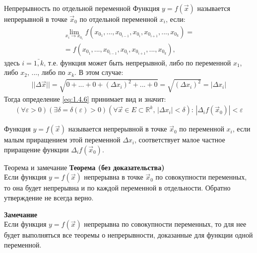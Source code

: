 \begin{tbox}{Непрерывность по отдельной переменной}
	Функция $y = f(\vec{x})$ называется непрерывной в точке $\vec{x}_0$ по отдельной переменной $x_i$, если:
	\begin{multline} \label{eq:1.4.9}
		\lim_{x_i \to x_\text{$0_i$}} f(x_\text{$0_1$}, ..., x_\text{$0_{i-1}$}, x_\text{$0_i$}, x_\text{$0_{i+1}$}, ..., x_\text{$0_k$}) =\\= f(x_\text{$0_1$}, ..., x_\text{$0_{i-1}$}, x_\text{$0_i$}, x_\text{$0_{i+1}$}, ..., x_\text{$0_k$}),
	\end{multline}
	здесь $i = \bar{1, k}$, т.е. функция может быть непрерывной, либо по переменной $x_1$, либо $x_2$, ..., либо по $x_k$. В этом случае:
	\begin{align} \label{eq:1.4.10}
		||\Delta \vec{x}|| = \sqrt{0 + ... + 0 + (\Delta x_i)^2 + ... + 0} = \sqrt{(\Delta x_i)^2} = |\Delta x_i|
	\end{align}
	Тогда определение \cref{eq:1.4.6} принимает вид и значит:
	\begin{align} \label{eq:1.4.11}
		(\forall \varepsilon > 0)(\exists \delta = \delta(\varepsilon) > 0)(\forall \vec{x} \in E \subset \mathbb{R}^k, \, |\Delta x_i| < \delta): \, |\Delta_i f(\vec{x}_0)| < \varepsilon
	\end{align}

	Функция $y=f(\vec{x})$ называется непрерывной в точке $\vec{x}_0$ по переменной $x_i$, если малым приращением этой переменной $\Delta x_i$, соответствует малое частное приращение функции $\Delta_i f(\vec{x}_0)$.
\end{tbox}

\begin{tbox*}{Теорема и замечание}
	\textbf{Теорема (без доказательства)} \\
	Если функция $y=f(\vec{x})$ непрерывна в точке $\vec{x}_0$ по совокупности переменных, то она будет непрерывна и по каждой переменной в отдельности. Обратно утверждение не всегда верно.

	\textbf{Замечание} \\
	Если функция $y = f(\vec{x})$ непрерывна по совокупности переменных, то для нее будет выполняться все теоремы о непрерывности, доказанные для функции одной переменной.
\end{tbox*}